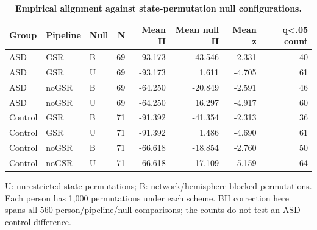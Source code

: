 \begin{table}[H]
\centering\small
\caption{\textbf{Empirical alignment against state-permutation null configurations.}}\label{tab:nulls}
\begin{tabular}{lllrrrrr}
\toprule
Group & Pipeline & Null & N & Mean H & Mean null H & Mean z & q<.05 count \\
\midrule
ASD & GSR & B & 69 & -93.173 & -43.546 & -2.331 & 40 \\
ASD & GSR & U & 69 & -93.173 & 1.611 & -4.705 & 61 \\
ASD & noGSR & B & 69 & -64.250 & -20.849 & -2.591 & 46 \\
ASD & noGSR & U & 69 & -64.250 & 16.297 & -4.917 & 60 \\
Control & GSR & B & 71 & -91.392 & -41.354 & -2.313 & 36 \\
Control & GSR & U & 71 & -91.392 & 1.486 & -4.690 & 61 \\
Control & noGSR & B & 71 & -66.618 & -18.854 & -2.760 & 50 \\
Control & noGSR & U & 71 & -66.618 & 17.109 & -5.159 & 64 \\
\bottomrule
\end{tabular}
\begin{flushleft}\footnotesize
U: unrestricted state permutations; B: network/hemisphere-blocked permutations. Each person has 1,000 permutations under each scheme. BH correction here spans all 560 person/pipeline/null comparisons; the counts do not test an ASD--control difference.
\end{flushleft}
\end{table}
